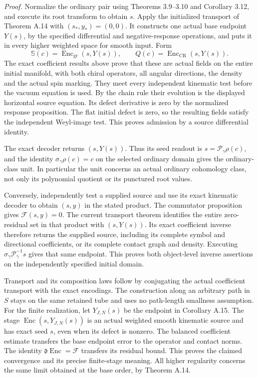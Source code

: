 \documentclass[
  english,
  11pt,
  reqno]{amsart}
\begin{document}
\emph{Proof.} Normalize the ordinary pair using Theorems 3.9--3.10 and
Corollary 3.12, and execute its root transform to obtain \(s\). Apply
the initialized transport of Theorem A.14 with \((s_*,y_*)=(0,0)\). It
constructs one actual base endpoint \(Y(s)\), by the specified
differential and negative-response operations, and puts it in every
higher weighted space for smooth input. Form \[
\mathbb S(c)=\operatorname{Enc}_{\mathrm{gr}}(s,Y(s)),\qquad
Q(c)=\operatorname{Enc}_{\mathrm{CR}}(s,Y(s)).
\] The exact coefficient results above prove that these are actual
fields on the entire initial manifold, with both chiral operators, all
angular directions, the density and the actual spin marking. They meet
every independent kinematic test before the vacuum equation is used. By
the chain rule their evolution is the displayed horizontal source
equation. Its defect derivative is zero by the normalized response
proposition. The flat initial defect is zero, so the resulting fields
satisfy the independent Weyl-image test. This proves admission by a
source differential identity.

The exact decoder returns \((s,Y(s))\). Thus its seed readout is
\(s=\mathscr P_\gamma\rho(c)\), and the identity
\(\sigma_\gamma\rho(c)=c\) on the selected ordinary domain gives the
ordinary-class unit. In particular the unit concerns an actual ordinary
cohomology class, not only its polynomial quotient or its punctured root
values.

Conversely, independently test a supplied source and use its exact
kinematic decoder to obtain \((s,y)\) in the stated product. The
commutator proposition gives \(\mathcal F(s,y)=0\). The current
transport theorem identifies the entire zero-residual set in that
product with \((s,Y(s))\). Its exact coefficient inverse therefore
returns the supplied source, including its complete symbol and
directional coefficients, or its complete contact graph and density.
Executing \(\sigma_\gamma\mathscr P_\gamma^{-1}s\) gives that same
endpoint. This proves both object-level inverse assertions on the
independently specified initial domain.

Transport and its composition laws follow by conjugating the actual
coefficient transport with the exact encodings. The construction along
an arbitrary path in \(S\) stays on the same retained tube and uses no
path-length smallness assumption. For the finite realization, let
\(Y_{J,N}(s)\) be the endpoint in Corollary A.15. The stage
\(\operatorname{Enc}(s,Y_{J,N}(s))\) is an actual weighted smooth
kinematic source and has exact seed \(s\), even when its defect is
nonzero. The balanced coefficient estimate transfers the base endpoint
error to the operator and contact norms. The identity
\(\mathfrak d\operatorname{Enc}=\mathcal F\) transfers its residual
bound. This proves the claimed convergence and its precise finite-stage
meaning. All higher regularity concerns the same limit obtained at the
base order, by Theorem A.14.
\end{document}
